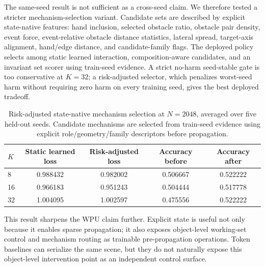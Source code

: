 \documentclass[11pt]{article}
\begin{document}
The same-seed result is not sufficient as a cross-seed claim. We therefore
tested a stricter mechanism-selection variant. Candidate sets are described by
explicit state-native features: hand inclusion, selected obstacle ratio,
obstacle pair density, event force, event-relative obstacle distance
statistics, lateral spread, target-axis alignment, hand/edge distance, and
candidate-family flags. The deployed policy selects among static learned
interaction, composition-aware candidates, and an invariant set scorer using
train-seed evidence. A strict no-harm seed-stable gate is too conservative at
\(K=32\); a risk-adjusted selector, which penalizes worst-seed harm without
requiring zero harm on every training seed, gives the best deployed tradeoff.

\begin{table}[t]
\centering
\begin{tabular}{lcccc}
\toprule
\(K\) & Static learned loss & Risk-adjusted loss & Accuracy before & Accuracy after \\
\midrule
8 & 0.988432 & 0.982002 & 0.506667 & 0.522222 \\
16 & 0.966183 & 0.951243 & 0.504444 & 0.517778 \\
32 & 1.004095 & 1.002597 & 0.475556 & 0.522222 \\
\bottomrule
\end{tabular}
\caption{Risk-adjusted state-native mechanism selection at \(N=2048\),
averaged over five held-out seeds. Candidate mechanisms are selected from
train-seed evidence using explicit role/geometry/family descriptors before
propagation.}
\label{tab:risk-adjusted-selection}
\end{table}

This result sharpens the WPU claim further. Explicit state is useful not only
because it enables sparse propagation; it also exposes object-level working-set
control and mechanism routing as trainable pre-propagation operations. Token
baselines can serialize the same scene, but they do not naturally expose this
object-level intervention point as an independent control surface.
\end{document}
